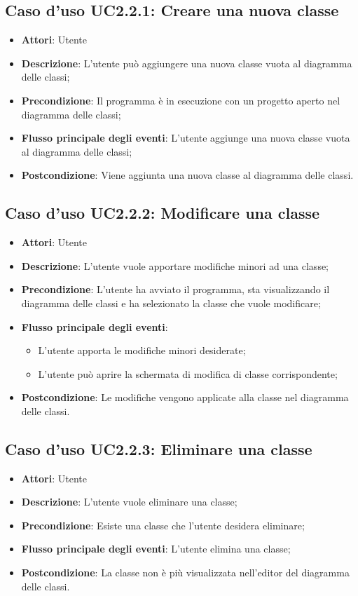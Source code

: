 \documentclass[../AnalisiDeiRequisiti.tex]{subfiles}
\begin{document}
	\subsection{Caso d'uso UC2.2.1: Creare una nuova classe}
	\begin{itemize}
		\item \textbf{Attori}: Utente
		\item \textbf{Descrizione}: L'utente può aggiungere una nuova classe vuota al diagramma delle classi;
		\item \textbf{Precondizione}: Il programma è in esecuzione con un progetto aperto nel diagramma delle classi;
		\item \textbf{Flusso principale degli eventi}: L'utente aggiunge una nuova classe vuota al diagramma delle classi;
		\item \textbf{Postcondizione}: Viene aggiunta una nuova classe al diagramma delle classi.
	\end{itemize}
	\subsection{Caso d'uso UC2.2.2: Modificare una classe}
	\begin{itemize}
		\item \textbf{Attori}: Utente
		\item \textbf{Descrizione}: L'utente vuole apportare modifiche minori ad una classe;
		\item \textbf{Precondizione}: L'utente ha avviato il programma, sta visualizzando il diagramma delle classi e ha selezionato la classe che vuole modificare;
		\item \textbf{Flusso principale degli eventi}: \begin{itemize}
			\item L'utente apporta le modifiche minori desiderate;
			\item L'utente può aprire la schermata di modifica di classe corrispondente;
		\end{itemize}
		\item \textbf{Postcondizione}: Le modifiche vengono applicate alla classe nel diagramma delle classi.
	\end{itemize}
	\subsection{Caso d'uso UC2.2.3: Eliminare una classe}
	\begin{itemize}
		\item \textbf{Attori}: Utente
		\item \textbf{Descrizione}: L'utente vuole eliminare una classe;
		\item \textbf{Precondizione}: Esiste una classe che l'utente desidera eliminare;
		\item \textbf{Flusso principale degli eventi}: L'utente elimina una classe;
		\item \textbf{Postcondizione}: La classe non è più visualizzata nell'editor del diagramma delle classi.
	\end{itemize}
\end{document}
